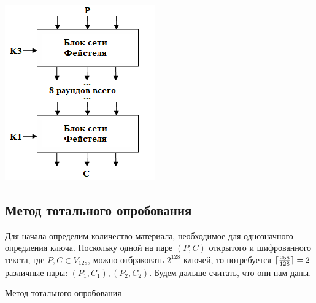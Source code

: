 \documentclass[a4paper,12pt]{article}
\DeclarePairedDelimiter{\ceil}{\lceil}{\rceil}
\newenvironment{Figure}
	{\par\medskip\noindent\minipage{\linewidth}}
	{\endminipage\par\medskip}
\theoremstyle{definition}
\begin{document}
\begin{multicols}{2}
        \begin{Figure}
			\centering
			\includegraphics[width=\linewidth]{cpiher.png}
		\end{Figure}			
	\end{multicols}

	\subsection*{Метод тотального опробования}
	
	Для начала определим количество материала, необходимое для однозначного опредления ключа. Поскольку одной на паре $(P, C)$ открытого и шифрованного текста, где $P, C \in V_{128}$, можно отбраковать $2^{128}$ ключей, то потребуется $\ceil{\frac{256}{128}} = 2$ различные пары: $(P_1, C_1), (P_2, C_2)$. Будем дальше считать, что они нам даны.
	
	
	\begin{algorithm}[H]
		
		\caption{Метод тотального опробования}
		\label{alg:Total}
		\SetAlgoNoEnd
		
		
	\end{algorithm}	
	
\end{document}
